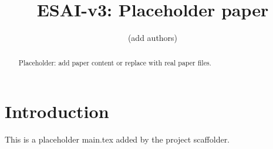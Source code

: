 \documentclass{article}
\begin{document}
\title{ESAI-v3: Placeholder paper}
\author{(add authors)}
\maketitle
\begin{abstract}
Placeholder: add paper content or replace with real paper files.
\end{abstract}
\section{Introduction}
This is a placeholder main.tex added by the project scaffolder.
\end{document}
